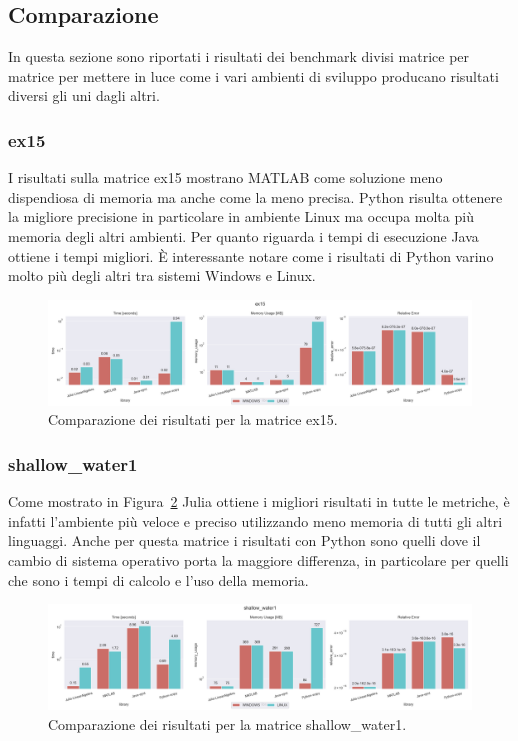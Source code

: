 \documentclass[a4paper, 12pt]{article}
\begin{document}
\subsection{Comparazione}
In questa sezione sono riportati i risultati dei benchmark divisi matrice per
matrice per mettere in luce come i vari ambienti di sviluppo producano risultati
diversi gli uni dagli altri.
\subsubsection{ex15}
I risultati sulla matrice ex15 mostrano MATLAB come soluzione meno dispendiosa
di memoria ma anche come la meno precisa. Python risulta ottenere la migliore
precisione in particolare in ambiente Linux ma occupa molta più memoria degli
altri ambienti. Per quanto riguarda i tempi di esecuzione Java ottiene i tempi
migliori. \`E interessante notare come i risultati di Python varino molto più
degli altri tra sistemi Windows e Linux.
\begin{figure}[ht]
\includegraphics[width=\textwidth]{ex15}
\caption{Comparazione dei risultati per la matrice ex15.}
\label{fig:ex15}
\end{figure}
\subsubsection{shallow\_water1}
Come mostrato in Figura~\ref{fig:shallow_water1} Julia ottiene i migliori
risultati in tutte le metriche, è infatti l'ambiente più veloce e preciso
utilizzando meno memoria di tutti gli altri linguaggi. Anche per questa matrice
i risultati con Python sono quelli dove il cambio di sistema operativo porta la
maggiore differenza, in particolare per quelli che sono i tempi di calcolo e
l'uso della memoria.
\begin{figure}[ht]
\includegraphics[width=\textwidth]{shallow_water1}
\caption{Comparazione dei risultati per la matrice shallow\_water1.}
\label{fig:shallow_water1}
\end{figure}
\end{document}
